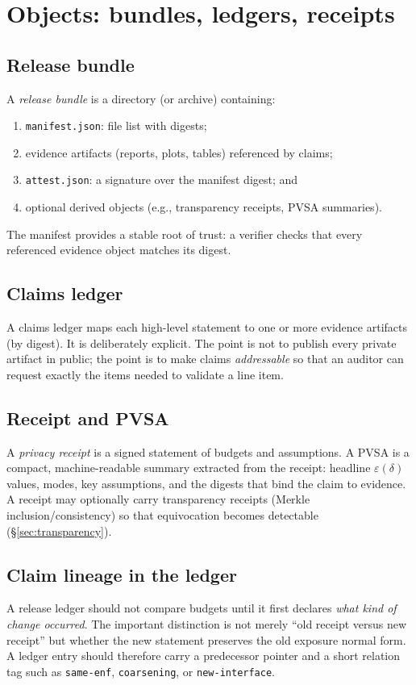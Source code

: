 \documentclass[11pt]{article}
\newcommand{\eps}{\varepsilon}
\begin{document}
\section{Objects: bundles, ledgers, receipts}
\subsection{Release bundle}
A \emph{release bundle} is a directory (or archive) containing:
\begin{enumerate}[leftmargin=1.4em]
\item \texttt{manifest.json}: file list with digests;
\item evidence artifacts (reports, plots, tables) referenced by claims;
\item \texttt{attest.json}: a signature over the manifest digest; and
\item optional derived objects (e.g., transparency receipts, PVSA summaries).
\end{enumerate}
The manifest provides a stable root of trust: a verifier checks that every referenced evidence object matches its digest.

\subsection{Claims ledger}
A claims ledger maps each high-level statement to one or more evidence artifacts (by digest).
It is deliberately explicit.
The point is not to publish every private artifact in public; the point is to make claims \emph{addressable} so that an auditor can request exactly the items needed to validate a line item.

\subsection{Receipt and PVSA}
A \emph{privacy receipt} is a signed statement of budgets and assumptions.
A PVSA is a compact, machine-readable summary extracted from the receipt: headline $\eps(\delta)$ values, modes, key assumptions, and the digests that bind the claim to evidence.
A receipt may optionally carry transparency receipts (Merkle inclusion/consistency) so that equivocation becomes detectable (\S\ref{sec:transparency}).

\subsection{Claim lineage in the ledger}
A release ledger should not compare budgets until it first declares \emph{what kind of change occurred}.
The important distinction is not merely ``old receipt versus new receipt'' but whether the new statement preserves the old exposure normal form.
A ledger entry should therefore carry a predecessor pointer and a short relation tag such as \texttt{same-enf}, \texttt{coarsening}, or \texttt{new-interface}.\cite{series:traceifaces,series:receiptitems,series:recert}
\end{document}
